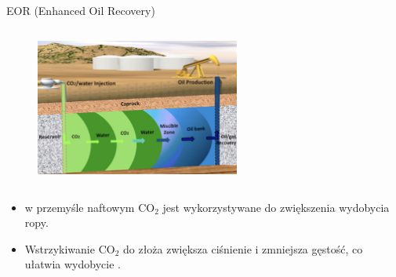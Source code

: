 \begin{columnframe}{EOR (Enhanced Oil Recovery)}
    \begin{column}{0.5\textwidth}
        \begin{figure}
            \centering
            \includegraphics[width=0.6\textwidth, frame]{images/enhanced_oil_recovery.png}
        \end{figure}
    \end{column}
    \begin{column}{0.5\textwidth}
        \begin{itemize}
            \item w przemyśle naftowym CO$_2$ jest wykorzystywane do zwiększenia wydobycia ropy.
            \item Wstrzykiwanie CO$_2$ do złoża zwiększa ciśnienie i zmniejsza gęstość, co ułatwia wydobycie .
        \end{itemize}
    \end{column}
\end{columnframe}

